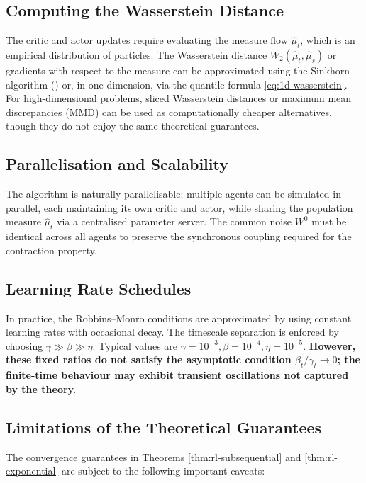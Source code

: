 \subsection{Computing the Wasserstein Distance}

The critic and actor updates require evaluating the measure flow $\hat\mu_t$, which
is an empirical distribution of particles. The Wasserstein distance
$W_2(\hat\mu_t, \hat\mu_s)$ or gradients with respect to the measure can be
approximated using the Sinkhorn algorithm () or, in one
dimension, via the quantile formula \eqref{eq:1d-wasserstein}. For high-dimensional
problems, sliced Wasserstein distances or maximum mean discrepancies (MMD) can be
used as computationally cheaper alternatives, though they do not enjoy the same
theoretical guarantees.

\subsection{Parallelisation and Scalability}

The algorithm is naturally parallelisable: multiple agents can be simulated in
parallel, each maintaining its own critic and actor, while sharing the population
measure $\hat\mu_t$ via a centralised parameter server. The common noise $W^0$ must
be identical across all agents to preserve the synchronous coupling required for the
contraction property.

\subsection{Learning Rate Schedules}

In practice, the Robbins--Monro conditions are approximated by using constant
learning rates with occasional decay. The timescale separation is enforced by
choosing $\gamma \gg \beta \gg \eta$. Typical values are
$\gamma = 10^{-3}, \beta = 10^{-4}, \eta = 10^{-5}$. \textbf{However, these fixed
ratios do not satisfy the asymptotic condition $\beta_t/\gamma_t \to 0$; the
finite-time behaviour may exhibit transient oscillations not captured by the
theory.}

\subsection{Limitations of the Theoretical Guarantees}

The convergence guarantees in Theorems \ref{thm:rl-subsequential} and
\ref{thm:rl-exponential} are subject to the following important caveats:

